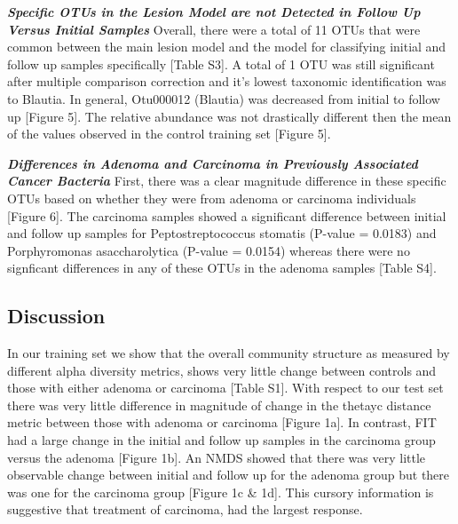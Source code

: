 \documentclass[12pt,]{article}
\begin{document}
\textbf{\emph{Specific OTUs in the Lesion Model are not Detected in
Follow Up Versus Initial Samples}} Overall, there were a total of 11
OTUs that were common between the main lesion model and the model for
classifying initial and follow up samples specifically {[}Table S3{]}. A
total of 1 OTU was still significant after multiple comparison
correction and it's lowest taxonomic identification was to Blautia. In
general, Otu000012 (Blautia) was decreased from initial to follow up
{[}Figure 5{]}. The relative abundance was not drastically different
then the mean of the values observed in the control training set
{[}Figure 5{]}.

\textbf{\emph{Differences in Adenoma and Carcinoma in Previously
Associated Cancer Bacteria}} First, there was a clear magnitude
difference in these specific OTUs based on whether they were from
adenoma or carcinoma individuals {[}Figure 6{]}. The carcinoma samples
showed a significant difference between initial and follow up samples
for Peptostreptococcus stomatis (P-value = 0.0183) and Porphyromonas
asaccharolytica (P-value = 0.0154) whereas there were no signficant
differences in any of these OTUs in the adenoma samples {[}Table S4{]}.

\newpage

\subsection{Discussion}\label{discussion}

In our training set we show that the overall community structure as
measured by different alpha diversity metrics, shows very little change
between controls and those with either adenoma or carcinoma {[}Table
S1{]}. With respect to our test set there was very little difference in
magnitude of change in the thetayc distance metric between those with
adenoma or carcinoma {[}Figure 1a{]}. In contrast, FIT had a large
change in the initial and follow up samples in the carcinoma group
versus the adenoma {[}Figure 1b{]}. An NMDS showed that there was very
little observable change between initial and follow up for the adenoma
group but there was one for the carcinoma group {[}Figure 1c \& 1d{]}.
This cursory information is suggestive that treatment of carcinoma, had
the largest response.
\end{document}
